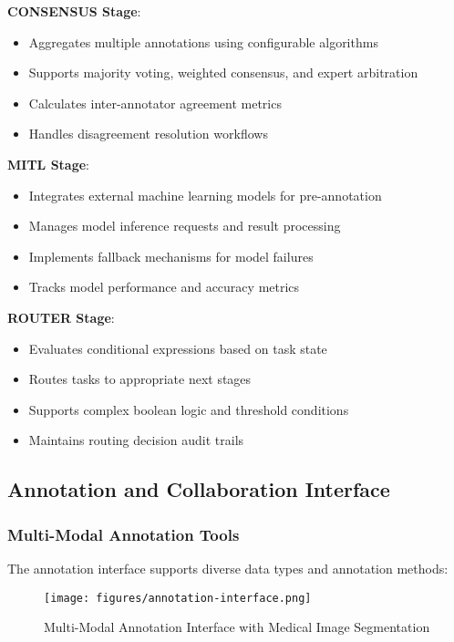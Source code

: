 \textbf{CONSENSUS Stage}:
\begin{itemize}
    \item Aggregates multiple annotations using configurable algorithms
    \item Supports majority voting, weighted consensus, and expert arbitration
    \item Calculates inter-annotator agreement metrics
    \item Handles disagreement resolution workflows
\end{itemize}

\textbf{MITL Stage}:
\begin{itemize}
    \item Integrates external machine learning models for pre-annotation
    \item Manages model inference requests and result processing
    \item Implements fallback mechanisms for model failures
    \item Tracks model performance and accuracy metrics
\end{itemize}

\textbf{ROUTER Stage}:
\begin{itemize}
    \item Evaluates conditional expressions based on task state
    \item Routes tasks to appropriate next stages
    \item Supports complex boolean logic and threshold conditions
    \item Maintains routing decision audit trails
\end{itemize}

\subsection{Annotation and Collaboration Interface}
\label{subsec:annotation-interface}

\subsubsection{Multi-Modal Annotation Tools}

The annotation interface supports diverse data types and annotation methods:

\begin{figure}[htbp]
\centering
\texttt{[image: figures/annotation-interface.png]}
\caption{Multi-Modal Annotation Interface with Medical Image Segmentation}
\label{fig:annotation-interface}
\end{figure}

